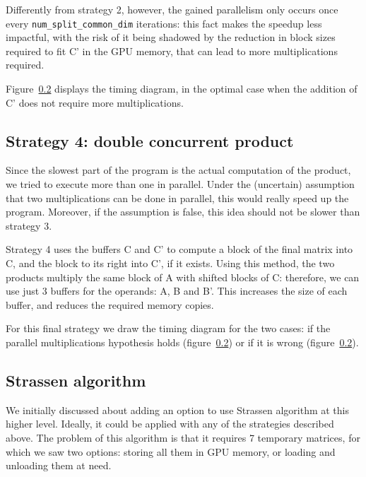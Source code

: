 Differently from strategy 2, however, the gained parallelism only occurs once every \texttt{num\_split\_common\_dim} iterations: this fact makes the speedup less impactful, with the risk of it being shadowed by the reduction in block sizes required to fit C' in the GPU memory, that can lead to more multiplications required.

Figure~\ref{} displays the timing diagram, in the optimal case when the addition of C' does not require more multiplications.


\subsection{Strategy 4: double concurrent product}

Since the slowest part of the program is the actual computation of the product, we tried to execute more than one in parallel.
Under the (uncertain) assumption that two multiplications can be done in parallel, this would really speed up the program.
Moreover, if the assumption is false, this idea should not be slower than strategy 3.

Strategy 4 uses the buffers C and C' to compute a block of the final matrix into C, and the block to its right into C', if it exists.
Using this method, the two products multiply the same block of A with shifted blocks of C: therefore, we can use just 3 buffers for the operands: A, B and B'.
This increases the size of each buffer, and reduces the required memory copies.

For this final strategy we draw the timing diagram for the two cases: if the parallel multiplications hypothesis holds (figure~\ref{}) or if it is wrong (figure~\ref{}).


\subsection{Strassen algorithm}

We initially discussed about adding an option to use Strassen algorithm at this higher level.
Ideally, it could be applied with any of the strategies described above.
The problem of this algorithm is that it requires 7 temporary matrices, for which we saw two options: storing all them in GPU memory, or loading and unloading them at need.

